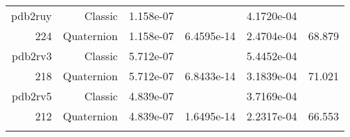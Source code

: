 \begin{xltabular}{\textwidth}{r|rS[table-format=1.3e+2]S[table-format=1.4e+2]S[table-format=1.4e+2]S[table-format=-1.3]}
pdb2ruy & Classic & 1.158e-07 &  & 4.1720e-04 & \\
224 & Quaternion & 1.158e-07 & 6.4595e-14 & 2.4704e-04 & 68.879\\  \addlinespace
pdb2rv3 & Classic & 5.712e-07 &  & 5.4452e-04 & \\
218 & Quaternion & 5.712e-07 & 6.8433e-14 & 3.1839e-04 & 71.021\\  \addlinespace
pdb2rv5 & Classic & 4.839e-07 &  & 3.7169e-04 & \\
212 & Quaternion & 4.839e-07 & 1.6495e-14 & 2.2317e-04 & 66.553\\  \addlinespace
\end{xltabular}
